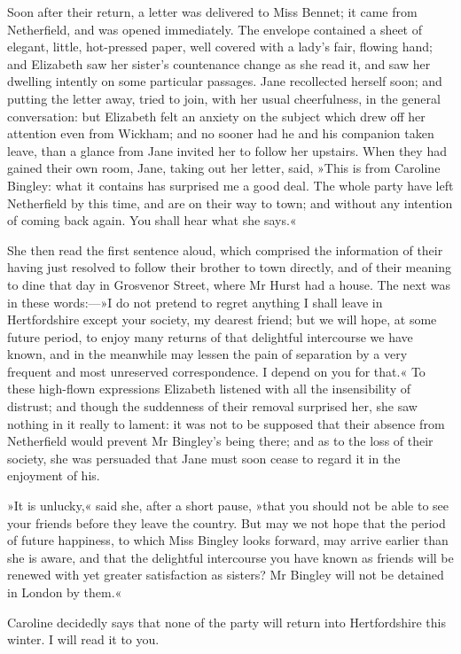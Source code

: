 Soon after their return, a letter was delivered to Miss Bennet; it came from Netherfield, and was opened immediately. The envelope contained a sheet of elegant, little, hot-pressed paper, well covered with a lady's fair, flowing hand; and Elizabeth saw her sister's countenance change as she read it, and saw her dwelling intently on some particular passages. Jane recollected herself soon; and putting the letter away, tried to join, with her usual cheerfulness, in the general conversation: but Elizabeth felt an anxiety on the subject which drew off her attention even from Wickham; and no sooner had he and his companion taken leave, than a glance from Jane invited her to follow her upstairs. When they had gained their own room, Jane, taking out her letter, said, »This is from Caroline Bingley: what it contains has surprised me a good deal. The whole party have left Netherfield by this time, and are on their way to town; and without any intention of coming back again. You shall hear what she says.«

She then read the first sentence aloud, which comprised the information of their having just resolved to follow their brother to town directly, and of their meaning to dine that day in Grosvenor Street, where Mr Hurst had a house. The next was in these words:—»I do not pretend to regret anything I shall leave in Hertfordshire except your society, my dearest friend; but we will hope, at some future period, to enjoy many returns of that delightful intercourse we have known, and in the meanwhile may lessen the pain of separation by a very frequent and most unreserved correspondence. I depend on you for that.« To these high-flown expressions Elizabeth listened with all the insensibility of distrust; and though the suddenness of their removal surprised her, she saw nothing in it really to lament: it was not to be supposed that their absence from Netherfield would prevent Mr Bingley's being there; and as to the loss of their society, she was persuaded that Jane must soon cease to regard it in the enjoyment of his.

»It is unlucky,« said she, after a short pause, »that you should not be able to see your friends before they leave the country. But may we not hope that the period of future happiness, to which Miss Bingley looks forward, may arrive earlier than she is aware, and that the delightful intercourse you have known as friends will be renewed with yet greater satisfaction as sisters? Mr Bingley will not be detained in London by them.«

Caroline decidedly says that none of the party will return into Hertfordshire this winter. I will read it to you.

